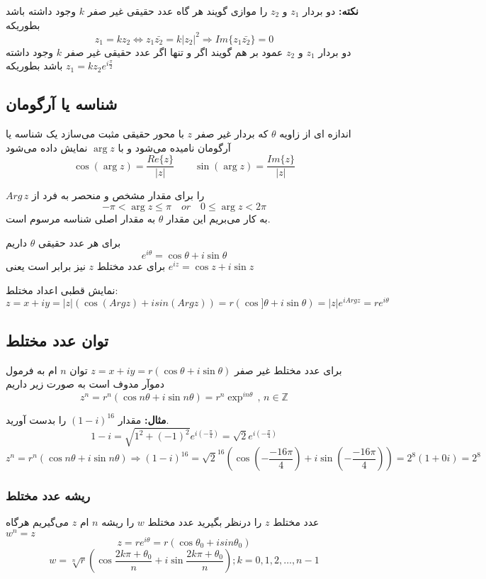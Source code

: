\documentclass[12pt]{report}
\begin{document}
	\textbf{نکته:}
	دو بردار 
	$z_1$
	و
	$z_2$
	را موازی گویند هر گاه عدد حقیقی غیر صفر 
	$k$
	وجود داشته باشد بطوریکه
	$$z_1 = kz_2 \Leftrightarrow z_1 \bar{z_2} = k |z_2|^2 \Rightarrow Im\{z_1 \bar{z_2}\}= 0$$
	دو بردار 
	$z_1$
	و 
	$z_2$
	عمود بر هم گویند اگر و تنها اگر عدد حقیقی غیر صفر 
	$k$
	وجود داشته باشد بطوریکه
	$z_1 = k z_2 e^{i\frac{\pi}{2}}$
	
	\subsection{شناسه یا آرگومان}
	اندازه ای از زاویه
	$\theta$
	که بردار غیر صفر
	$z$
	با محور حقیقی مثبت می‌سازد یک شناسه یا آرگومان نامیده می‌شود و با
	$\arg{z}$
	نمایش داده می‌شود
	$$\cos (\arg z) = \frac{Re\{z\}}{|z|} \qquad \sin(\arg z) = \frac{Im\{z\}}{|z|}$$
	
	$Arg \, z$
	را برای مقدار مشخص و منحصر به فرد از
	$$-\pi < \arg z \leq \pi \quad or \quad 0\leq  \arg z < 2\pi$$
	به کار می‌بریم این مقدار 
	$\theta$
	به مقدار اصلی شناسه مرسوم است.
	
	برای هر عدد حقیقی 
	$\theta$
	داریم
	$$e^{i \theta} = \cos \theta + i \sin \theta$$
	برای عدد مختلط
	$z$
	 نیز برابر است یعنی
	 $e^{iz} = \cos z + i \sin z$
	 
	 نمایش قطبی اعداد مختلط:
	 $$z = x +iy = |z|(\cos (Arg z) + i sin(Arg z)) = r (\cos ]\theta + i \sin \theta) = |z|e^{iArg z} = re^{i\theta}$$
	 
	 \subsection{توان عدد مختلط}
	 برای عدد مختلط غیر صفر
	 $z = x + iy = r(\cos \theta + i \sin \theta)$
	 توان 
	 $n$
	 ام
	 به فرمول دموآر مدوف است به صورت زیر داریم
	 $$z^n = r^n(\cos n\theta + i \sin n\theta) = r^n \exp^{in\theta} \,,\, n \in \mathbb{Z}$$
	 
	 \textbf{مثال:}
	 مقدار 
	 $(1 - i)^{16}$
	 را بدست آورید.
	 $$1 - i = \sqrt{1^2 + (-1)^2} e^{i (-\frac{\pi}{4})} = \sqrt{2}e^{i (-\frac{\pi}{4})}$$
	 $$z^n = r^n(\cos n \theta + i\sin n\theta) \Rightarrow (1 - i)^{16} = \sqrt{2}^{16} (\cos (-\frac{-16 \pi}{4}) + i \sin (-\frac{-16 \pi}{4})) = 2^8(1+ 0i) = 2^8$$
	 \subsubsection{ریشه عدد مختلط}
	 عدد مختلط 
	 $z$
	 را درنظر بگیرید عدد مختلط 
	 $w$
	 را ریشه 
	 $n$
	 ام 
	 $z$
	 می‌گیریم هرگاه
	 $w^n = z\qquad$
	 $$z = re^{i \theta} = r(\cos \theta_0 + i sin \theta_0) $$
	 $$ w = \sqrt[n]{r}(\cos \frac{2k\pi + \theta_0}{n} + i \sin \frac{2k\pi + \theta_0}{n}) ; k = 0, 1, 2, \dots, n -1 $$
	 
\end{document}
